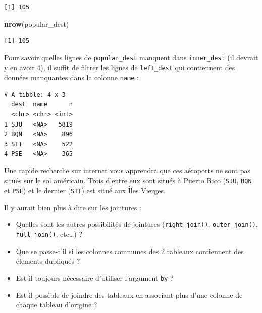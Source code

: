 \documentclass[a4paperpaper,]{article}
\newenvironment{Shaded}{\begin{snugshade}}{\end{snugshade}}
\newcommand{\KeywordTok}[1]{\textcolor[rgb]{0.12,0.11,0.11}{\textbf{#1}}}
\newcommand{\NormalTok}[1]{\textcolor[rgb]{0.12,0.11,0.11}{#1}}
\newcommand{\OperatorTok}[1]{\textcolor[rgb]{0.12,0.11,0.11}{#1}}
\newcommand{\StringTok}[1]{\textcolor[rgb]{0.75,0.01,0.01}{#1}}
\providecommand{\tightlist}{%
  \setlength{\itemsep}{0pt}\setlength{\parskip}{0pt}}
\begin{document}
\begin{verbatim}
[1] 105
\end{verbatim}

\begin{Shaded}
\begin{Highlighting}[]
\KeywordTok{nrow}\NormalTok{(popular_dest)}
\end{Highlighting}
\end{Shaded}

\begin{verbatim}
[1] 105
\end{verbatim}

Pour savoir quelles lignes de \texttt{popular\_dest} manquent dans \texttt{inner\_dest} (il devrait y en avoir 4), il suffit de filtrer les lignes de \texttt{left\_dest} qui contiennent des données manquantes dans la colonne \texttt{name} :

\begin{Shaded}
\end{Shaded}

\begin{verbatim}
# A tibble: 4 x 3
  dest  name      n
  <chr> <chr> <int>
1 SJU   <NA>   5819
2 BQN   <NA>    896
3 STT   <NA>    522
4 PSE   <NA>    365
\end{verbatim}

Une rapide recherche sur internet vous apprendra que ces aéroports ne sont pas situés sur le sol américain. Trois d'entre eux sont situés à Puerto Rico (\texttt{SJU}, \texttt{BQN} et \texttt{PSE}) et le dernier (\texttt{STT}) est situé aux Îles Vierges.

Il y aurait bien plus à dire sur les jointures :

\begin{itemize}
\tightlist
\item
  Quelles sont les autres possibilités de jointures (\texttt{right\_join()}, \texttt{outer\_join()}, \texttt{full\_join()}, etc\ldots{}) ?
\item
  Que se passe-t'il si les colonnes communes des 2 tableaux contiennent des élements dupliqués ?
\item
  Est-il toujours nécessaire d'utiliser l'argument \texttt{by} ?
\item
  Est-il possible de joindre des tableaux en associant plus d'une colonne de chaque tableau d'origine ?
\end{itemize}
\end{document}
